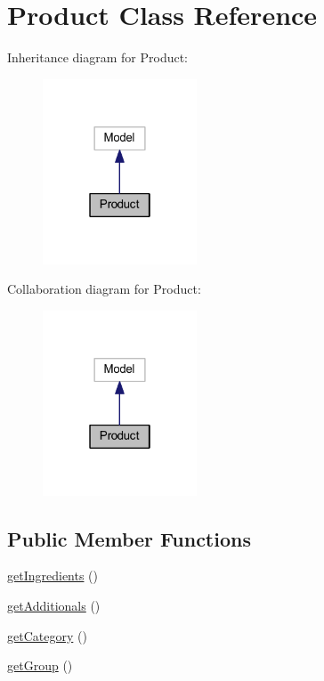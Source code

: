 \hypertarget{class_app_1_1_models_1_1_product_1_1_product}{}\section{Product Class Reference}
\label{class_app_1_1_models_1_1_product_1_1_product}


Inheritance diagram for Product\+:
\nopagebreak
\begin{figure}[H]
\begin{center}
\leavevmode
\includegraphics[width=130pt]{class_app_1_1_models_1_1_product_1_1_product__inherit__graph}
\end{center}
\end{figure}


Collaboration diagram for Product\+:
\nopagebreak
\begin{figure}[H]
\begin{center}
\leavevmode
\includegraphics[width=130pt]{class_app_1_1_models_1_1_product_1_1_product__coll__graph}
\end{center}
\end{figure}
\subsection*{Public Member Functions}
\begin{DoxyCompactItemize}
\item 
\mbox{\hyperlink{class_app_1_1_models_1_1_product_1_1_product_a3ee17085a1e0dbe24e05f504147deb8a}{get\+Ingredients}} ()
\item 
\mbox{\hyperlink{class_app_1_1_models_1_1_product_1_1_product_a6f78a9ab9472f9f82fe70dd84d6c5e5c}{get\+Additionals}} ()
\item 
\mbox{\hyperlink{class_app_1_1_models_1_1_product_1_1_product_ada0bf69887885f455ebdfbe878e14543}{get\+Category}} ()
\item 
\mbox{\hyperlink{class_app_1_1_models_1_1_product_1_1_product_a4f44e7bc9de772c21b4304d11e87bf16}{get\+Group}} ()
\end{DoxyCompactItemize}
